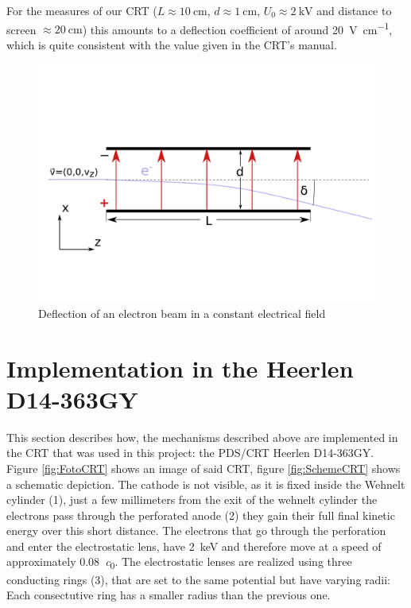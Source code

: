 For the measures of our CRT ($ L \approx \SI{10}{\centi\meter}$, $d \approx \SI{1}{\centi\meter}$, $U_0 \approx \SI{2}{\kilo\volt}$ and distance to screen $\approx \SI{20}{\centi\meter}$) this amounts to a deflection coefficient of around \SI{20}{\volt\per\centi\meter}, which is quite consistent with the value given in the CRT's manual. 

\begin{figure}
	\centering
	\includegraphics[width=0.7\linewidth]{Chapters/CRT-Basics/DeflectionPlate2}
	\caption{Deflection of an electron beam in a constant electrical field}
	\label{fig:deflectionplate2}
\end{figure}

\section{Implementation in the Heerlen D14-363GY }

This section describes how, the mechanisms described above are implemented in the CRT that was used in this project: the PDS/CRT Heerlen D14-363GY. Figure \ref{fig:FotoCRT}  shows an image of said CRT, figure \ref{fig:SchemeCRT} shows a schematic depiction. The cathode is not visible, as it is fixed inside the Wehnelt cylinder (1), just a few millimeters from the exit of the wehnelt cylinder the electrons pass through the perforated anode (2) they gain their full final kinetic energy over this short distance. The electrons that go through the perforation and enter the electrostatic lens, have \SI{2}{\kilo\electronvolt} and therefore move at a speed of approximately \SI{0.08}{\clight}. 
The electrostatic lenses are realized using three conducting rings (3), that are set to the same potential but have varying radii: Each consectutive ring has a smaller radius than the previous one. 

